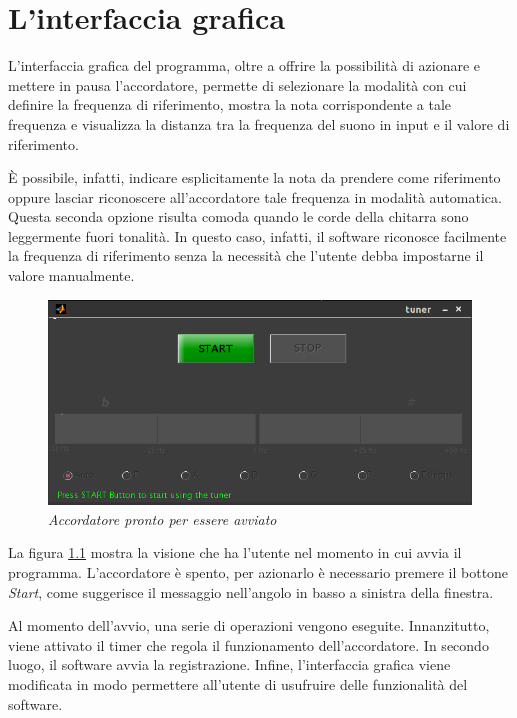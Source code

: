 \chapter{L'interfaccia grafica}\label{cap:interfaccia}

L'interfaccia grafica del programma, oltre a offrire la possibilità di azionare e mettere in pausa l'accordatore, permette di selezionare la modalità con cui definire la frequenza di riferimento, mostra la nota corrispondente a tale frequenza e visualizza la distanza tra la frequenza del suono in input e il valore di riferimento.

È possibile, infatti, indicare esplicitamente la nota da prendere come riferimento oppure lasciar riconoscere all'accordatore tale frequenza in modalità automatica.
Questa seconda opzione risulta comoda quando le corde della chitarra sono leggermente fuori tonalità.
In questo caso, infatti, il software riconosce facilmente la frequenza di riferimento senza la necessità che l'utente debba impostarne il valore manualmente.

	\begin{figure}[h]
	  \begin{center} 
	    \includegraphics[width=\textwidth*\real{0.8}]{images/ch_07/accordatore_fermo.png}
	  \end{center} 
	  \caption{\textit{Accordatore pronto per essere avviato}}  
	  \label{fig:accordatore_fermo}
	\end{figure}

La figura \ref{fig:accordatore_fermo} mostra la visione che ha l'utente nel momento in cui avvia il programma.
L'accordatore è spento, per azionarlo è necessario premere il bottone \emph{Start}, come suggerisce il messaggio nell'angolo in basso a sinistra della finestra.

Al momento dell'avvio, una serie di operazioni vengono eseguite.
Innanzitutto, viene attivato il timer che regola il funzionamento dell'accordatore.
In secondo luogo, il software avvia la registrazione.
Infine, l'interfaccia grafica viene modificata in modo permettere all'utente di usufruire delle funzionalità del software.

